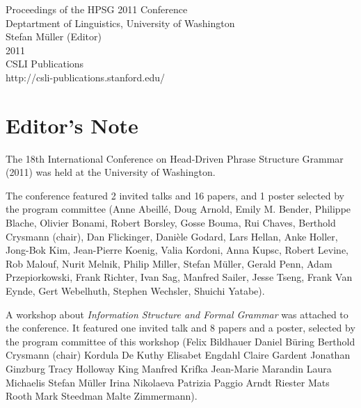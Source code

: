 \documentclass[11pt,a4paper,fleqn]{article}
\begin{document}
\begin{center}
{\Large
                Proceedings of the HPSG 2011 Conference\\[\baselineskip]

                       Deptartment of Linguistics, University of Washington\\[\baselineskip]

                        Stefan M{\"u}ller (Editor)\\[\baselineskip]

                                2011\\[\baselineskip]

                          CSLI Publications\\[\baselineskip]

              http://csli-publications.stanford.edu/ 
}
\end{center}
\newpage
\tableofcontents

\newpage

\section{Editor's Note}

The 18th International Conference on Head-Driven Phrase Structure Grammar (2011) was held at the University of Washington.

The conference featured 2 invited talks and 16 papers, and 1 poster selected by the program committee (Anne Abeillé,
Doug Arnold,
Emily M. Bender,
Philippe Blache,
Olivier Bonami,
Robert Borsley,
Gosse Bouma,
Rui Chaves,
Berthold Crysmann (chair),
Dan Flickinger,
Danièle Godard,
Lars Hellan,
Anke Holler,
Jong-Bok Kim,
Jean-Pierre Koenig,
Valia Kordoni,
Anna Kupsc,
Robert Levine,
Rob Malouf,
Nurit Melnik,
Philip Miller,
Stefan Müller,
Gerald Penn,
Adam Przepiorkowski,
Frank Richter,
Ivan Sag,
Manfred Sailer,
Jesse Tseng,
Frank Van Eynde,
Gert Webelhuth,
Stephen Wechsler,
Shuichi Yatabe).

A workshop about \emph{Information Structure and Formal Grammar}
was attached to the conference. It featured one invited talk and 8 papers and a poster, selected by the program
committee of this workshop (Felix Bildhauer
Daniel Büring
Berthold Crysmann (chair)
Kordula De Kuthy
Elisabet Engdahl
Claire Gardent
Jonathan Ginzburg
Tracy Holloway King
Manfred Krifka
Jean-Marie Marandin
Laura Michaelis
Stefan Müller
Irina Nikolaeva
Patrizia Paggio
Arndt Riester
Mats Rooth
Mark Steedman
Malte Zimmermann).
\end{document}
